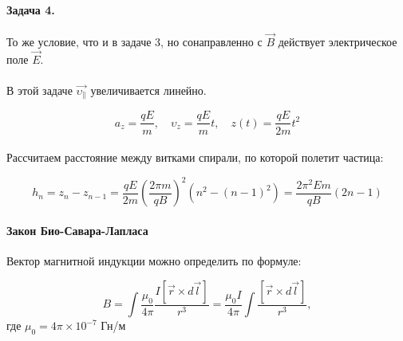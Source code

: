 \documentclass[dvipdfmx]{article}
\begin{document}
\paragraph{Задача 4.}

То же условие, что и в задаче 3, но сонаправленно с $\vec{B}$ действует электрическое поле $\vec{E}$.

\paragraph{}

В этой задаче $\vec{\upsilon_\parallel}$ увеличивается линейно.

\begin{equation*}
  a_z = \frac{qE}{m}, \quad \upsilon_z = \frac{qE}{m}t, \quad z(t) = \frac{qE}{2m}t^2
\end{equation*}

\paragraph{}

\newpage

Рассчитаем расстояние между витками спирали, по которой полетит частица:

\begin{equation*}
  h_n = z_n - z_{n-1} = \frac{qE}{2m}\left(\frac{2\pi m}{qB}\right)^2\left(n^2-(n-1)^2\right) = \frac{2\pi^2Em}{qB}(2n-1)
\end{equation*}

\paragraph{Закон Био-Савара-Лапласа} Вектор магнитной индукции можно определить по формуле:

\begin{equation*}
  B = \int \frac{\mu_0}{4\pi} \frac{ I[\vec{r} \times d \vec{l}] }{r^3} =
  \frac{\mu_0I}{4\pi}\int\frac{[\vec{r}\times d\vec{l}]}{r^3},
\end{equation*}
где $\mu_0 = 4\pi \times 10^{-7}$ Гн/м
\end{document}
